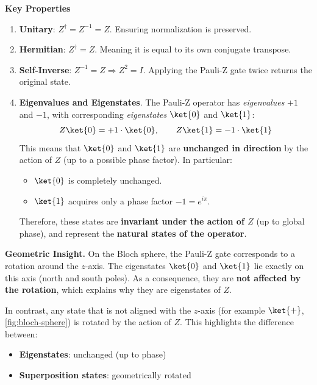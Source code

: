 \highspace
\begin{flushleft}
    \textcolor{Green3}{ \textbf{Key Properties}}
\end{flushleft}
\begin{enumerate}
    \item \textbf{Unitary}: $Z^{\dagger} = Z^{-1} = Z$. Ensuring normalization is preserved.
    \item \textbf{Hermitian}: $Z^{\dagger} = Z$. Meaning it is equal to its own conjugate transpose.
    \item \textbf{Self-Inverse}: $Z^{-1} = Z \Rightarrow Z^{2} = I$. Applying the Pauli-Z gate twice returns the original state.
    \item \textbf{Eigenvalues and Eigenstates}. The Pauli-Z operator has \emph{eigenvalues} $+1$ and $-1$, with corresponding \emph{eigenstates} $\ket{0}$ and $\ket{1}$:
    \begin{equation*}
        Z\ket{0} = +1 \cdot \ket{0}, \hspace{2em} Z\ket{1} = -1 \cdot \ket{1}
    \end{equation*}
    This means that $\ket{0}$ and $\ket{1}$ are \textbf{unchanged in direction} by the action of $Z$ (up to a possible phase factor). In particular:
    \begin{itemize}
        \item $\ket{0}$ is completely unchanged.
        \item $\ket{1}$ acquires only a phase factor $-1 = e^{i\pi}$.
    \end{itemize}
    Therefore, these states are \textbf{invariant under the action of $Z$} (up to global phase), and represent the \textbf{natural states of the operator}.
\end{enumerate}

\newpage

\noindent
\textcolor{Green3}{ \textbf{Geometric Insight.}} On the Bloch sphere, the Pauli-Z gate corresponds to a rotation around the $z$-axis. The eigenstates $\ket{0}$ and $\ket{1}$ lie exactly on this axis (north and south poles). As a consequence, they are \textbf{not affected by the rotation}, which explains why they are eigenstates of $Z$.

\highspace
In contrast, any state that is not aligned with the $z$-axis (for example $\ket{+}$, \autoref{fig:bloch-sphere}) is rotated by the action of $Z$. This highlights the difference between:
\begin{itemize}
    \item \textbf{Eigenstates}: unchanged (up to phase)
    \item \textbf{Superposition states}: geometrically rotated
\end{itemize}